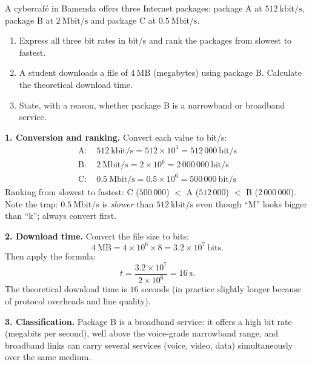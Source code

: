 \documentclass[11pt]{article}
\newcommand{\cle}[1]{{\popxbold\color{popdark}#1}}
\begin{document}
\begin{exoresolu}
A cybercaf\'e in Bamenda offers three Internet packages: package A at $512\ \mathrm{kbit/s}$, package B at $2\ \mathrm{Mbit/s}$ and package C at $0.5\ \mathrm{Mbit/s}$.
\begin{enumerate}
\item Express all three bit rates in bit/s and rank the packages from slowest to fastest.
\item A student downloads a file of $4\ \mathrm{MB}$ (megabytes) using package B. Calculate the theoretical download time.
\item State, with a reason, whether package B is a narrowband or broadband service.
\end{enumerate}
\tcblower
\textbf{1. Conversion and ranking.} Convert each value to bit/s:
\begin{align*}
\text{A: } & 512\ \mathrm{kbit/s} = 512 \times 10^3 = 512\,000\ \mathrm{bit/s}\\
\text{B: } & 2\ \mathrm{Mbit/s} = 2 \times 10^6 = 2\,000\,000\ \mathrm{bit/s}\\
\text{C: } & 0.5\ \mathrm{Mbit/s} = 0.5 \times 10^6 = 500\,000\ \mathrm{bit/s}
\end{align*}
Ranking from slowest to fastest: C ($500\,000$) $<$ A ($512\,000$) $<$ B ($2\,000\,000$). Note the trap: $0.5\ \mathrm{Mbit/s}$ is \emph{slower} than $512\ \mathrm{kbit/s}$ even though ``M'' looks bigger than ``k''; always convert first.

\textbf{2. Download time.} Convert the file size to bits:
\[ 4\ \mathrm{MB} = 4 \times 10^6 \times 8 = 3.2 \times 10^7\ \mathrm{bits}. \]
Then apply the formula:
\[ t = \dfrac{3.2 \times 10^7}{2 \times 10^6} = 16\ \mathrm{s}. \]
The theoretical download time is $16$ seconds (in practice slightly longer because of protocol overheads and line quality).

\textbf{3. Classification.} Package B is a \cle{broadband} service: it offers a high bit rate (megabits per second), well above the voice-grade narrowband range, and broadband links can carry several services (voice, video, data) simultaneously over the same medium.
\end{exoresolu}
\end{document}

